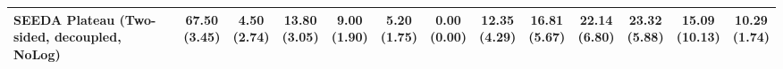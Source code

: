 \begin{table}[H]
{\begin{tabular}{l|cccccc|cccccc}
SEEDA Plateau (Two-sided, decoupled, NoLog) & \bfseries \makecell{67.50 \\ (3.45)} & \makecell{4.50 \\ (2.74)} & {\cellcolor[HTML]{C8E6C9}} \makecell{13.80 \\ (3.05)} & \makecell{9.00 \\ (1.90)} & \makecell{5.20 \\ (1.75)} & \makecell{0.00 \\ (0.00)} & \makecell{12.35 \\ (4.29)} & \makecell{16.81 \\ (5.67)} & {\cellcolor[HTML]{C8E6C9}} \makecell{22.14 \\ (6.80)} & \bfseries \makecell{23.32 \\ (5.88)} & \makecell{15.09 \\ (10.13)} & \makecell{10.29 \\ (1.74)} \\
\bottomrule
\end{tabular}
}%
\end{table}
